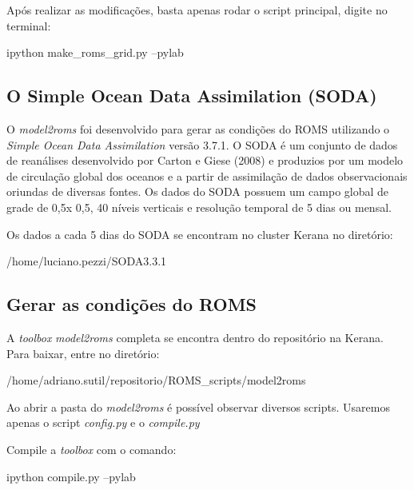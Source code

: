 \noindent Após realizar as modificações, basta apenas rodar o script principal, digite no terminal:
\bigskip

\begin{bashcode}
ipython make_roms_grid.py --pylab
\end{bashcode}
\bigskip

\subsection{O Simple Ocean Data Assimilation (SODA)}
\bigskip

\noindent O \textit{model2roms} foi desenvolvido para gerar as condições do ROMS utilizando o \textit{Simple Ocean Data Assimilation} versão 3.7.1. O SODA é um conjunto de dados de reanálises desenvolvido por Carton e Giese (2008) e produzios por um modelo de circulação global dos oceanos e a partir de assimilação de dados observacionais oriundas de diversas fontes. Os dados do SODA possuem um campo global de grade de 0,5\degree x 0,5\degree, 40 níveis verticais e resolução temporal de 5 dias ou mensal.
\bigskip

\noindent Os dados a cada 5 dias do SODA se encontram no cluster Kerana no diretório:
\bigskip

\begin{bashcode}
/home/luciano.pezzi/SODA3.3.1
\end{bashcode}
\bigskip

\subsection{Gerar as condições do ROMS}
\bigskip

\noindent A \textit{toolbox} \textit{model2roms} completa se encontra dentro do repositório na Kerana. Para baixar, entre no diretório:
\bigskip

\begin{bashcode}
/home/adriano.sutil/repositorio/ROMS_scripts/model2roms
\end{bashcode}
\bigskip

\noindent Ao abrir a pasta do \textit{model2roms} é possível observar diversos scripts. Usaremos apenas o script \textit{config.py} e o \textit{compile.py}
\bigskip

\noindent Compile a \textit{toolbox} com o comando:
\bigskip

\begin{bashcode}
  ipython compile.py --pylab
\end{bashcode}
\bigskip

